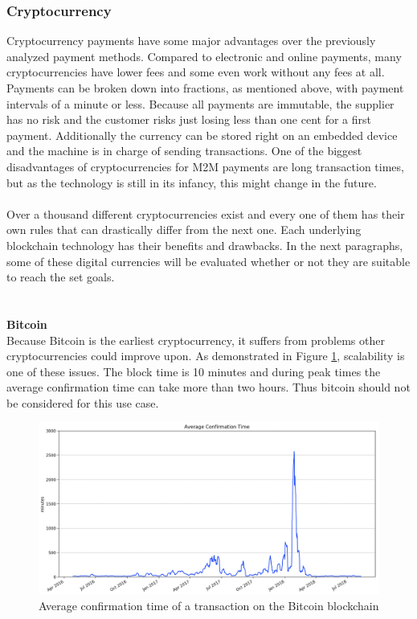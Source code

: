 \subsubsection{Cryptocurrency}
Cryptocurrency payments have some major advantages over the previously analyzed payment methods.
Compared to electronic and online payments, many cryptocurrencies have lower fees and some even work without any fees at all.
Payments can be broken down into fractions, as mentioned above, with payment intervals of a minute or less.
Because all payments are immutable, the supplier has no risk and the customer risks just losing less than one cent for a first payment.
Additionally the currency can be stored right on an embedded device and the machine is in charge of sending transactions.
One of the biggest disadvantages of cryptocurrencies for M2M payments are long transaction times, but as the technology is still in its infancy, this might change in the future.
\\\\
Over a thousand different cryptocurrencies exist\cite{coincap} and every one of them has their own rules that can drastically differ from the next one.
Each underlying blockchain technology has their benefits and drawbacks.
In the next paragraphs, some of these digital currencies will be evaluated whether or not they are suitable to reach the set goals.
\\\\\\
\textbf{Bitcoin}\\
Because Bitcoin is the earliest cryptocurrency, it suffers from problems other cryptocurrencies could improve upon.
As demonstrated in Figure \ref{fig:BitcoinConfirmationTime}, scalability is one of these issues.
The block time is 10 minutes\cite{bitcoin-whitepaper} and during peak times the average confirmation time can take more than two hours.
Thus bitcoin should not be considered for this use case.
\\
\begin{figure}[H]
    \includegraphics[width=\textwidth]{img/average-confirmation-time.png}
    \caption{Average confirmation time of a transaction on the Bitcoin blockchain\cite{btc-conf-time}}
    \label{fig:BitcoinConfirmationTime}
\end{figure}
